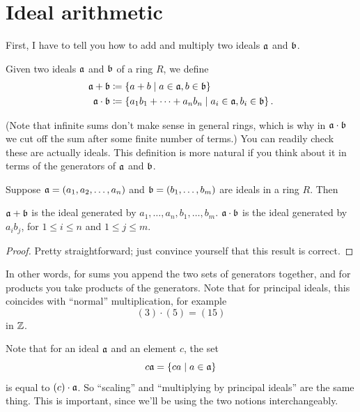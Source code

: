 \section{Ideal arithmetic}
First, I have to tell you how to add and multiply two ideals $\mathfrak a$ and $\mathfrak b$.
\begin{definition}
	Given two ideals $\mathfrak a$ and $\mathfrak b$ of a ring $R$, we define
	\begin{align*}
		\mathfrak a + \mathfrak b &\coloneqq \left\{ a+b \mid a \in \mathfrak a, b \in \mathfrak b \right\} \\
		\mathfrak a \cdot \mathfrak b &\coloneqq \left\{ a_1b_1 + \dots + a_n b_n
			\mid a_i \in \mathfrak a, b_i \in \mathfrak b \right\}.
	\end{align*}
\end{definition}
(Note that infinite sums don't make sense in general rings, which is why in $\mathfrak a \cdot \mathfrak b$
we cut off the sum after some finite number of terms.)
You can readily check these are actually ideals.
This definition is more natural if you think about it in terms of
the generators of $\mathfrak a$ and $\mathfrak b$.
\begin{proposition}
	Suppose $\mathfrak a = \left( a_1, a_2, \dots, a_n \right)$
	and $\mathfrak b = \left( b_1, \dots, b_m \right)$ are ideals in a ring $R$.
	Then
	\begin{enumerate}[(a)]
		\ii $\mathfrak a + \mathfrak b$ is the ideal generated by $a_1, \dots, a_n, b_1, \dots, b_m$.
		\ii $\mathfrak a \cdot \mathfrak b$ is the ideal generated by $a_i b_j$,
		for $1 \le i \le n$ and $1 \le j \le m$.
	\end{enumerate}
\end{proposition}
\begin{proof}
	Pretty straightforward; just convince yourself that this result is correct.
\end{proof}
In other words, for sums you append the two sets of generators together,
and for products you take products of the generators.
Note that for principal ideals, this coincides with ``normal'' multiplication,
for example
\[ (3) \cdot (5) = (15) \]
in $\mathbb Z$.
\begin{remark}
Note that for an ideal $\mathfrak a$ and an element $c$,
the set \[ c \mathfrak a = \left\{ ca \mid a \in \mathfrak a \right\} \]
is equal to $(c) \cdot \mathfrak a$.
So ``scaling'' and ``multiplying by principal ideals'' are the same thing.
This is important, since we'll be using the two notions interchangeably.
\end{remark}
